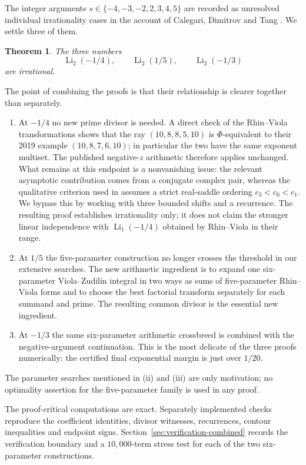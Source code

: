 \documentclass[11pt]{amsart}
\newcommand{\Li}{\operatorname{Li}}
\theoremstyle{plain}
\newtheorem{theorem}{Theorem}[section]
\theoremstyle{remark}\newtheorem{remark}[theorem]{Remark}
\numberwithin{equation}{section}
\begin{document}
The integer arguments $s\in\{-4,-3,-2,2,3,4,5\}$ are recorded as unresolved individual irrationality cases in the account of Calegari, Dimitrov and Tang \cite[Remark~2.8.2 and \S15.2]{CDT}.  We settle three of them.

\begin{theorem}\label{thm:main}
The three numbers
\[
 \Li_2(-1/4),\qquad \Li_2(1/5),\qquad \Li_2(-1/3)
\]
are irrational.
\end{theorem}

The point of combining the proofs is that their relationship is clearer together than separately.
\begin{enumerate}[label=(\roman*),leftmargin=2.2em]
\item At $-1/4$ no new prime divisor is needed.  A direct check of the Rhin--Viola transformations shows that the ray $(10,8,8,5,10)$ is $\Phi$-equivalent to their 2019 example $(10,8,7,6,10)$; in particular the two have the same exponent multiset.  The published negative-$z$ arithmetic therefore applies unchanged.  What remains at this endpoint is a nonvanishing issue: the relevant asymptotic contribution comes from a conjugate complex pair, whereas the qualitative criterion used in \cite{RV19} assumes a strict real-saddle ordering $c_3<c_0<c_1$.  We bypass this by working with three bounded shifts and a recurrence.  The resulting proof establishes irrationality only; it does not claim the stronger linear independence with $\Li_1(-1/4)$ obtained by Rhin--Viola in their range.
\item At $1/5$ the five-parameter construction no longer crosses the threshold in our extensive searches.  The new arithmetic ingredient is to expand one six-parameter Viola--Zudilin integral in two ways as sums of five-parameter Rhin--Viola forms and to choose the best factorial transform separately for each summand and prime.  The resulting common divisor is the essential new ingredient.
\item At $-1/3$ the same six-parameter arithmetic crossbreed is combined with the negative-argument continuation.  This is the most delicate of the three proofs numerically: the certified final exponential margin is just over $1/20$.
\end{enumerate}
The parameter searches mentioned in (ii) and (iii) are only motivation; no optimality assertion for the five-parameter family is used in any proof.

The proof-critical computations are exact.  Separately implemented checks reproduce the coefficient identities, divisor witnesses, recurrences, contour inequalities and endpoint signs.  Section~\ref{sec:verification-combined} records the verification boundary and a $10{,}000$-term stress test for each of the two six-parameter constructions.
\end{document}
